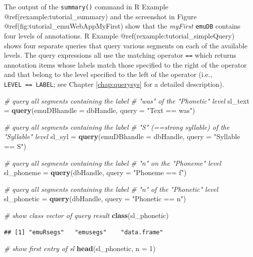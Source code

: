 \documentclass[]{book}
\newenvironment{Shaded}{\begin{snugshade}}{\end{snugshade}}
\newcommand{\KeywordTok}[1]{\textcolor[rgb]{0.13,0.29,0.53}{\textbf{{#1}}}}
\newcommand{\DataTypeTok}[1]{\textcolor[rgb]{0.13,0.29,0.53}{{#1}}}
\newcommand{\DecValTok}[1]{\textcolor[rgb]{0.00,0.00,0.81}{{#1}}}
\newcommand{\StringTok}[1]{\textcolor[rgb]{0.31,0.60,0.02}{{#1}}}
\newcommand{\CommentTok}[1]{\textcolor[rgb]{0.56,0.35,0.01}{\textit{{#1}}}}
\newcommand{\NormalTok}[1]{{#1}}
\theoremstyle{definition}
\theoremstyle{definition}
\theoremstyle{definition}
\theoremstyle{remark}
\begin{document}
The output of the \texttt{summary()} command in R Example
@ref(rexample:tutorial\_summary) and the screenshot in Figure
@ref(fig:tutorial\_emuWebAppMyFirst) show that the \emph{myFirst}
\texttt{emuDB} contains four levels of annotations. R Example
@ref(rexample:tutorial\_simpleQuery) shows four separate queries that
query various segments on each of the available levels. The query
expressions all use the matching operator \texttt{==} which returns
annotation items whose labels match those specified to the right of the
operator and that belong to the level specified to the left of the
operator (i.e., \texttt{LEVEL\ ==\ LABEL}; see Chapter
\ref{chap:querysys} for a detailed description).

\begin{Shaded}
\begin{Highlighting}[]
\CommentTok{# query all segments containing the label}
\CommentTok{# "was" of the "Phonetic" level}
\NormalTok{sl_text =}\StringTok{ }\KeywordTok{query}\NormalTok{(}\DataTypeTok{emuDBhandle =} \NormalTok{dbHandle,}
                \DataTypeTok{query =} \StringTok{"Text == was"}\NormalTok{)}

\CommentTok{# query all segments containing the label}
\CommentTok{# "S" (==strong syllable) of the "Syllable" level}
\NormalTok{sl_syl =}\StringTok{ }\KeywordTok{query}\NormalTok{(}\DataTypeTok{emuDBhandle =} \NormalTok{dbHandle,}
               \DataTypeTok{query =} \StringTok{"Syllable == S"}\NormalTok{)}

\CommentTok{# query all segments containing the label}
\CommentTok{# "n" on the "Phoneme" level}
\NormalTok{sl_phoneme =}\StringTok{ }\KeywordTok{query}\NormalTok{(dbHandle,}
                   \DataTypeTok{query =} \StringTok{"Phoneme == f"}\NormalTok{)}

\CommentTok{# query all segments containing the label}
\CommentTok{# "n" of the "Phonetic" level}
\NormalTok{sl_phonetic =}\StringTok{ }\KeywordTok{query}\NormalTok{(dbHandle,}
                    \DataTypeTok{query =} \StringTok{"Phonetic == n"}\NormalTok{)}

\CommentTok{# show class vector of query result}
\KeywordTok{class}\NormalTok{(sl_phonetic)}
\end{Highlighting}
\end{Shaded}

\begin{verbatim}
## [1] "emuRsegs"   "emusegs"    "data.frame"
\end{verbatim}

\begin{Shaded}
\begin{Highlighting}[]
\CommentTok{# show first entry of sl}
\KeywordTok{head}\NormalTok{(sl_phonetic, }\DataTypeTok{n =} \DecValTok{1}\NormalTok{)}
\end{Highlighting}
\end{Shaded}
\end{document}
